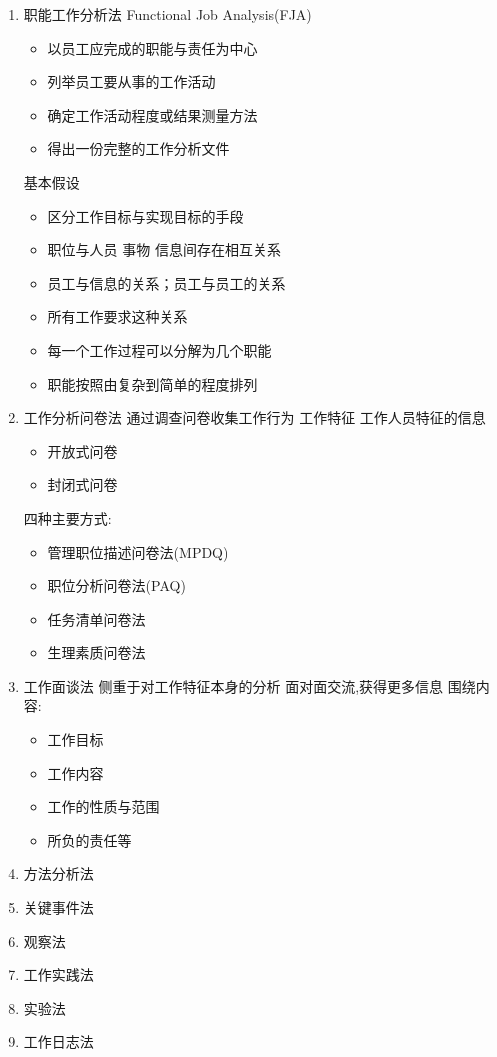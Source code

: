 \documentclass{ctexart}
\begin{document}
\begin{enumerate}
\item 职能工作分析法
\label{sec-1-3-1-1}
Functional Job Analysis(FJA)
\begin{itemize}
\item 以员工应完成的职能与责任为中心
\item 列举员工要从事的工作活动
\item 确定工作活动程度或结果测量方法
\item 得出一份完整的工作分析文件
\end{itemize}
基本假设
\begin{itemize}
\item 区分工作目标与实现目标的手段
\item 职位与人员 事物 信息间存在相互关系
\item 员工与信息的关系；员工与员工的关系
\item 所有工作要求这种关系
\item 每一个工作过程可以分解为几个职能
\item 职能按照由复杂到简单的程度排列
\end{itemize}
\item 工作分析问卷法
\label{sec-1-3-1-2}
通过调查问卷收集工作行为 工作特征 工作人员特征的信息
\begin{itemize}
\item 开放式问卷
\item 封闭式问卷
\end{itemize}
四种主要方式:
\begin{itemize}
\item 管理职位描述问卷法(MPDQ)
\item 职位分析问卷法(PAQ)
\item 任务清单问卷法
\item 生理素质问卷法
\end{itemize}
\item 工作面谈法
\label{sec-1-3-1-3}
侧重于对工作特征本身的分析
面对面交流,获得更多信息
围绕内容:
\begin{itemize}
\item 工作目标
\item 工作内容
\item 工作的性质与范围
\item 所负的责任等
\end{itemize}
\item 方法分析法
\label{sec-1-3-1-4}
\item 关键事件法
\label{sec-1-3-1-5}
\item 观察法
\label{sec-1-3-1-6}
\item 工作实践法
\label{sec-1-3-1-7}
\item 实验法
\label{sec-1-3-1-8}
\item 工作日志法
\label{sec-1-3-1-9}
\end{enumerate}
\end{document}
